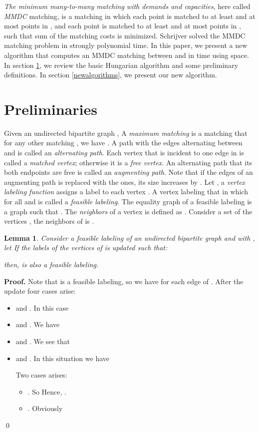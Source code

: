 \documentclass[preprint,12pt]{elsarticle}
\begin{document}
\textit {The minimum many-to-many matching with demands and capacities}, here called \textit {MMDC} matching, is a matching in which each point  is matched to at least  and at most  points in , and each point  is matched to at least  and at most  points in , such that sum of the matching costs is minimized.
Schrijver \cite{7} solved the MMDC matching problem in strongly polynomial time. In this paper, we present a new algorithm that computes an MMDC matching between  and  in  time using  space. In section \ref{Preliminaries}, we review the basic Hungarian algorithm and some preliminary definitions. In section \ref{newalgorithms}, we present our new algorithm. 

\section {Preliminaries}
\label{Preliminaries}
Given an undirected bipartite graph , A \textit {maximum matching}  is a matching that for any other matching , we have . A path with the edges alternating between  and  is called an \textit {alternating path}. Each vertex  that is incident to one edge in  is called a \textit {matched vertex}; otherwise it is a \textit {free vertex}. An alternating path that its both endpoints are free is called an \textit {augmenting path}. Note that if the  edges of an augmenting path is replaced with the  ones, its size increases by . Let , a \textit {vertex labeling function}  assigns a label to each vertex . A vertex labeling that in which  for all  and  is called a \textit {feasible labeling}. The equality graph of a feasible labeling  is a graph  such that . The \textit {neighbors} of a vertex  is defined as . Consider a set of the vertices , the neighbors of  is .
\newtheorem{lemma}{Lemma}
\begin{lemma}
\label{lem1}
Consider a feasible labeling  of an undirected bipartite graph  and   with , let 
 If the labels of the vertices of  is updated such that:
 
then,  is also a feasible labeling.
\end{lemma}

\textbf {Proof.} Note that  is a feasible labeling, so we have  for each edge  of . After the update four cases arise:
\begin{itemize}
\item  and . In this case  
\item  and . We have 
\item  and . We see that 
\item  and . In this situation we have 

Two cases arises: 
\begin{itemize}

\item . So 
 Hence, .  

\item . Obviously 


\end{itemize}

\end{itemize}
\qed
\end{document}
